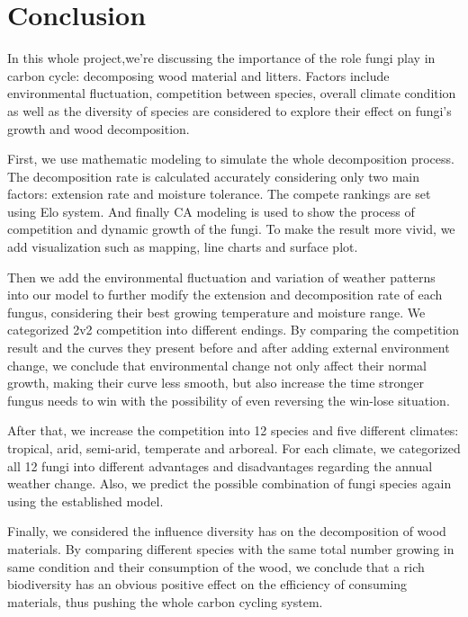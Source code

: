 \documentclass[a4paper,12pt]{article}
\begin{document}
\section{Conclusion}
In this whole project,we're discussing the importance of the role fungi play in carbon cycle: decomposing wood material and litters. Factors include environmental fluctuation, competition between species, overall climate condition as well as the diversity of species are considered to explore their effect on fungi's growth and wood decomposition.

First, we use mathematic modeling to simulate the whole decomposition process. The decomposition rate is calculated accurately considering only two main factors: extension rate and moisture tolerance. The compete rankings are set using Elo system. And finally CA modeling is used to show the process of competition and dynamic growth of the fungi. To make the result more vivid, we add visualization such as mapping, line charts and surface plot.

Then we add the environmental fluctuation and variation of weather patterns into our model to further modify the extension and decomposition rate of each fungus, considering their best growing temperature and moisture range. We categorized 2v2 competition into different endings. By comparing the competition result and the curves they present before and after adding external environment change, we conclude that environmental change not only affect their normal growth, making their curve less smooth, but also increase the time stronger fungus needs to win with the possibility of even reversing the win-lose  situation.

After that, we increase the competition into 12 species and five different climates: tropical, arid, semi-arid, temperate and arboreal. For each climate, we categorized all 12 fungi into different advantages and disadvantages regarding the annual weather change. Also, we predict the possible combination of fungi species again using the established model.

Finally, we considered the influence diversity has on the decomposition of wood materials. By comparing different species with the same total number growing in same condition and their consumption of the wood, we conclude that a rich biodiversity has an obvious positive effect on the efficiency of consuming materials, thus pushing the whole carbon cycling system.
\end{document}
